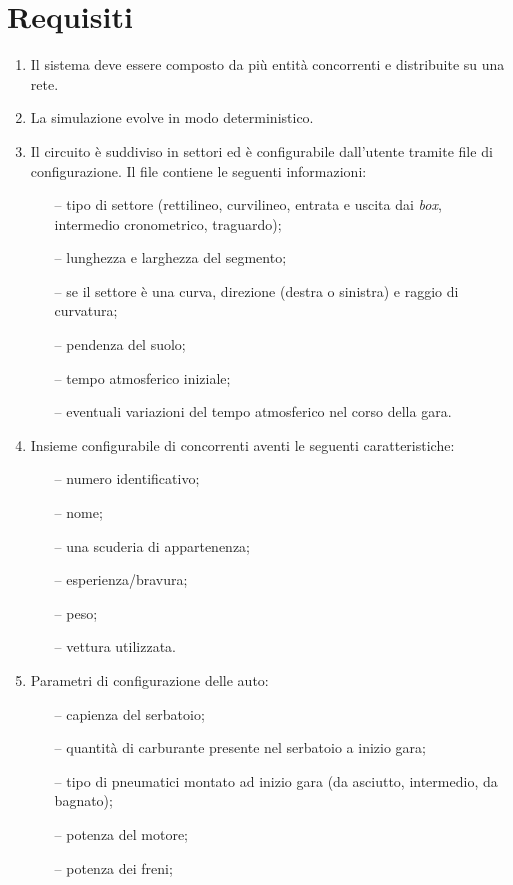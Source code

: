 \documentclass[11pt,a4paper]{report}
\begin{document}
\chapter{Requisiti}
\begin{enumerate}
\item Il sistema deve essere composto da più entità concorrenti e distribuite su una rete.
\item La simulazione evolve in modo deterministico.
\item Il circuito è suddiviso in settori ed è configurabile dall'utente tramite file di configurazione. Il file contiene le seguenti informazioni:
	\begin{itemize}
	\item[--] tipo di settore (rettilineo, curvilineo, entrata e uscita dai \textit{box}, intermedio cronometrico, traguardo);
	\item[--] lunghezza e larghezza del segmento;
	\item[--] se il settore è una curva, direzione (destra o sinistra) e raggio di curvatura;
	\item[--] pendenza del suolo;
	\item[--] tempo atmosferico iniziale;
	\item[--] eventuali variazioni del tempo atmosferico nel corso della gara.
	\end{itemize}
\item Insieme configurabile di concorrenti aventi le seguenti caratteristiche:
	\begin{itemize}
	\item[--] numero identificativo;
	\item[--] nome;
	\item[--] una scuderia di appartenenza;
	\item[--] esperienza/bravura;
	\item[--] peso;
	\item[--] vettura utilizzata.
	\end{itemize}
\item Parametri di configurazione delle auto:
	\begin{itemize}
	\item[--] capienza del serbatoio;
	\item[--] quantità di carburante presente nel serbatoio a inizio gara;
	\item[--] tipo di pneumatici montato ad inizio gara (da asciutto, intermedio, da bagnato);
	\item[--] potenza del motore;
	\item[--] potenza dei freni;

\end{itemize}
\end{enumerate}
\end{document}
